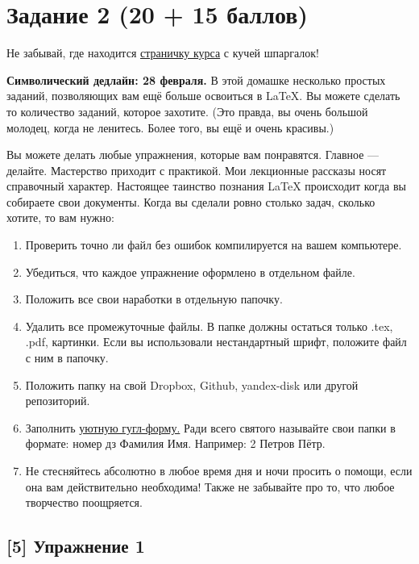 \documentclass[12pt, a4paper, oneside]{article}
\begin{document}
\section*{Задание 2  (20 + 15 баллов)}

Не забывай, где находится  \href{https://fulyankin.github.io/LaTeX/}{страничку курса} с кучей шпаргалок!

\textbf{Символический дедлайн:  28 февраля.} В этой домашке несколько простых заданий, позволяющих вам ещё больше освоиться в \LaTeX{.}  Вы можете сделать то количество заданий, которое захотите. (Это правда, вы очень большой молодец, когда не ленитесь. Более того, вы ещё и очень красивы.) 

Вы можете делать любые упражнения, которые вам понравятся. Главное --- делайте. Мастерство приходит с практикой. Мои лекционные рассказы носят справочный характер. Настоящее таинство познания \LaTeX{} происходит когда вы собираете свои документы. Когда вы сделали ровно столько задач, сколько хотите, то вам нужно:

\begin{enumerate}
\item Проверить точно ли файл без ошибок компилируется на вашем компьютере.
\item Убедиться, что каждое упражнение оформлено в отдельном файле.
\item Положить все свои наработки в отдельную папочку.
\item Удалить все промежуточные файлы. В папке должны остаться только .tex, .pdf, картинки. Если вы использовали нестандартный шрифт, положите файл с ним в папочку.
\item Положить папку на	свой	Dropbox, Github,	yandex-disk	или другой	репозиторий.
\item Заполнить	\href{https://docs.google.com/forms/d/e/1FAIpQLSe11kxKVfv07iCL1E9yNX7ll9swKImiVwRr1H70lslGzInRSg/viewform}{уютную гугл-форму.} Ради всего святого называйте свои папки в формате: номер дз Фамилия Имя. Например: 2 Петров Пётр.
\item Не стесняйтесь абсолютно в любое время дня и ночи просить о помощи, если она вам действительно необходима! Также не забывайте про то, что любое творчество поощряется. 
\end{enumerate}

\subsection*{[5]  Упражнение 1 }
\end{document}
